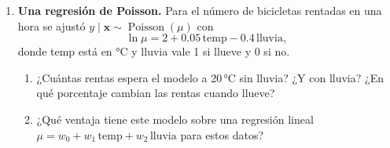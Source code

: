 \documentclass[11pt]{article}
\newcommand{\vx}{\mathbf{x}}
\newcommand{\espacio}[1]{\par\vspace{#1}}
\begin{document}
\begin{enumerate}
\item \textbf{Una regresión de Poisson.} Para el número de bicicletas rentadas en una hora se ajustó $y \mid \vx \sim \operatorname{Poisson}(\mu)$ con
\[
\ln \mu = 2 + 0.05\,\text{temp} - 0.4\,\text{lluvia},
\]
donde temp está en °C y lluvia vale 1 si llueve y 0 si no.
\begin{enumerate}
  \item ¿Cuántas rentas espera el modelo a 20\,°C sin lluvia? ¿Y con lluvia? ¿En qué porcentaje cambian las rentas cuando llueve?
  \espacio{2.5cm}

  \item ¿Qué ventaja tiene este modelo sobre una regresión lineal $\mu = w_0 + w_1\,\text{temp} + w_2\,\text{lluvia}$ para estos datos?
  \espacio{2.2cm}
\end{enumerate}

\end{enumerate}
\end{document}
